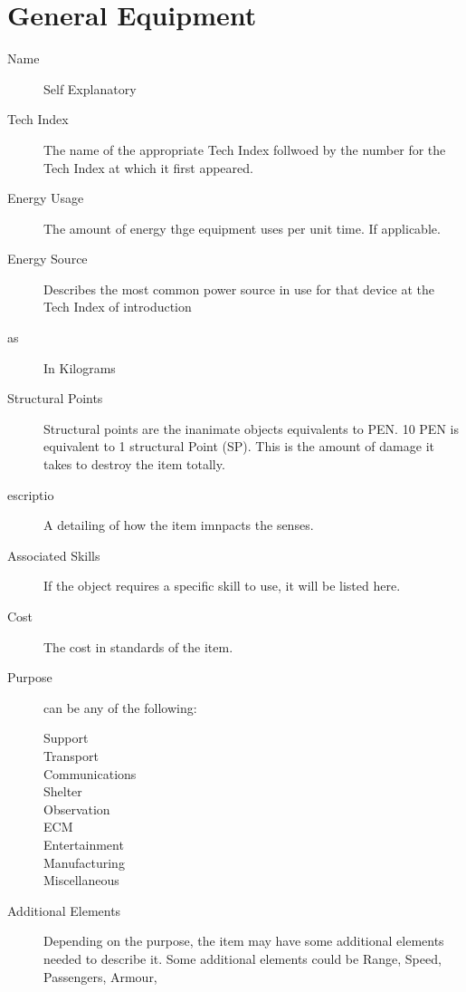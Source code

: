 \chapter{General Equipment}

\begin{description}
	\item[Name]
	Self Explanatory
	\item[Tech Index]
	The name of the appropriate Tech Index follwoed by the number for 
	the Tech Index at which it first appeared.
	\item[Energy Usage]
	The amount of energy thge equipment uses per unit time. If 
	applicable.
	\item[Energy Source]
	Describes the most common power source in use for that device at 
	the Tech Index of introduction
	\item[as]
	In Kilograms
	\item[Structural Points]
	Structural points are the in\-ani\-mate ob\-jects equivalents to PEN. 
	10 PEN is equivalent to 1 structural Point (SP). This is the amount 
	of damage it takes to destroy the item totally.
	\item[escriptio]
	A detailing of how the item imnpacts the senses.
	\item[Associated Skills ]
	If the object requires a specific skill to use, it will be listed 
	here.                 
	\item[Cost]
	The cost in standards of the item. 
	\item[Purpose]
	can be any of the following:
	\begin{description}
		\item[Support]
		\item[Transport]
		\item[Communications]
		\item[Shelter]
		\item[Observation]
		\item[ECM]
		\item[Entertainment]
		\item[Manufacturing]
		\item[Miscellaneous]
	\end{description}
	\item[Additional Elements]
	Depending on the pur\-pose, the item may have some additional elements 
	needed to describe it. Some additional elements could be Range, Speed, Passengers, Armour, 
\end{description}


